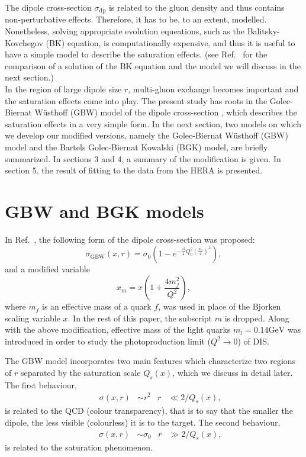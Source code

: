 \documentclass[11pt]{article}
\begin{document}
The dipole cross-section $\sigma_{\mathrm{dp}}$ is related to the gluon density and thus contains non-perturbative effects. {\color{blue} Therefore, it has to be, to an extent, modelled. Nonetheless, solving appropriate evolution equeations, such as the Balitsky-Kovchegov (BK) equation, is computationally expensive, and thus it is useful to have a simple model to describe the saturation effects. (see Ref.~\cite{kutak2005} for the comparison of a solution of the BK equation and the model we will discuss in the next section.)}\\
In the region of large dipole size $r$, multi-gluon exchange becomes important and the saturation effects come into play. The present study has roots in the Golec-Biernat W\"usthoff (GBW) model of the dipole cross-section \cite{gbw1998}, which describes the saturation effects in a very simple form.
In the next section, two models on which we develop our modified versions, namely the Golec-Biernat W\"usthoff (GBW) model\cite{gbw1998} and the Bartels Golec-Biernat Kowalski (BGK) model\cite{bgk2002}, are briefly summarized.  In sections 3 and 4, a summary of the modification is given. In section 5, the result of fitting to the data from the HERA\cite{hera} is presented. %
 
\section{GBW and BGK models }
In Ref.~\cite{gbw1998}, the following form of the dipole cross-section was proposed:
\begin{equation}
\sigma_{\mathrm{GBW}}(x ,r )=\sigma_{0} \left(1-e^{-\frac{r^2}{4} Q_0^2\left(\frac{x_0}{x}\right)^{\lambda} }\right),
\label{eq:gbw}
\end{equation}
and a modified variable 
\begin{equation}
x_m=x \left(1+\frac{4 m_f^2}{Q^2}\right),
\label{eq:modx}
\end{equation}
where $m_f$ is an effective mass of a quark $f$,
was used in place of the Bjorken scaling variable $x$. In the rest of this paper, the subscript $m$ is dropped. Along with the above modification, effective mass of the light quarks $m_l=0.14\mathrm{GeV}$ was introduced in order to study the photoproduction limit ($Q^2\rightarrow0$) of DIS. 

The GBW model incorporates two main features which characterize two regions of $r$ separated by the saturation scale $Q_s(x)$, which we discuss in detail later.
The first behaviour, 
\begin{align}
&& \sigma(x,r)&\sim r^2 & r&\ll 2/Q_s(x),
\end{align}
is related to the QCD (colour transparency), that is to say that the smaller the dipole, the less visible (colourless) it is to the target. 
The second behaviour,
\begin{align}
&& \sigma(x,r)&\sim \sigma_0 & r&\gg 2/Q_s(x),
\end{align}
is related to the saturation phenomenon. \\
\end{document}
